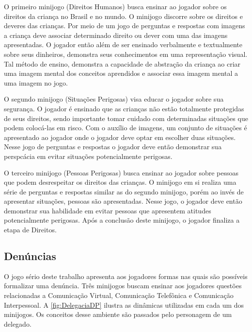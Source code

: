 O primeiro minijogo (Direitos Humanos) busca ensinar ao jogador sobre os direitos da criança no Brasil e no mundo. O minijogo discorre sobre os direitos e deveres das crianças. Por meio de um jogo de perguntas e respostas com imagens a criança deve associar determinado direito ou dever com uma das imagens apresentadas. O jogador então além de ser ensinado verbalmente e textualmente sobre seus dinheiros, demonstra seus conhecimentos em uma representação visual. Tal método de ensino, demonstra a capacidade de abstração da criança ao criar uma imagem mental dos conceitos aprendidos e associar essa imagem mental a uma imagem no jogo. 

O segundo minijogo (Situações Perigosas) visa educar o jogador sobre sua segurança. O jogador é ensinado que as crianças não estão totalmente protegidas de seus direitos, sendo importante tomar cuidado com determinadas situações que podem colocá-las em risco. %
Com o auxílio de imagens, um conjunto de situações é apresentado ao jogador onde o jogador deve optar em escolher duas situações. Nesse jogo de perguntas e respostas o jogador deve então demonstrar sua perspcácia em evitar situações potencialmente perigosas.

O terceiro minijogo (Pessoas Perigosas) busca ensinar ao jogador sobre pessoas que podem desrespeitar os direitos das crianças. O minijogo em si realiza uma série de perguntas e respostas similar as do segundo minijogo, porém ao invés de apresentar situações, pessoas são apresentadas. Nesse jogo, o jogador deve então demonstrar sua habilidade em evitar pessoas que apresentem atitudes potencialmente perigosas. Após a conclusão deste minijogo, o jogador finaliza a etapa de Direitos. 

\subsection{Denúncias}\label{subsec:3}

O jogo sério deste trabalho apresenta aos jogadores formas nas quais são possíveis formalizar uma denúncia. Três minijogos buscam ensinar aos jogadores questões relacionadas a Comunicação Virtual, Comunicação Telefônica e Comunicação Interpessoal. A \autoref{fig:DelegaciaDP} ilustra as dinâmicas utilizadas em cada um dos minijogos. Os conceitos desse ambiente são passados pelo personagem de um delegado. 

